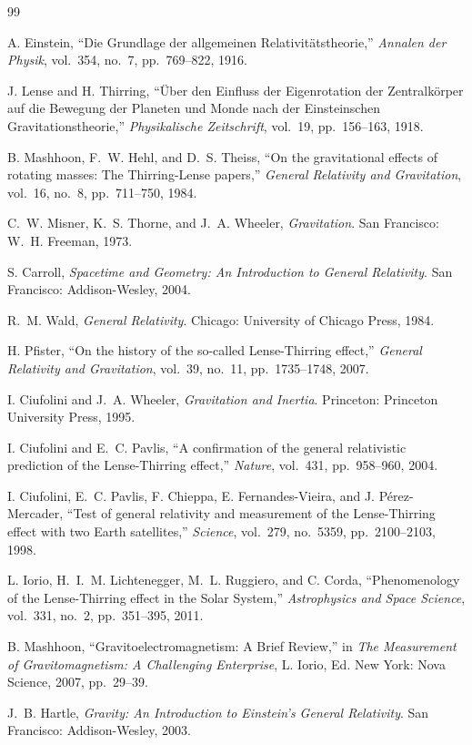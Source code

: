 \documentclass[12pt, a4paper]{article}
\theoremstyle{plain}
\theoremstyle{definition}
\theoremstyle{remark}
\begin{document}
\newpage








\newpage
\begin{thebibliography}{99}

A. Einstein, ``Die Grundlage der allgemeinen Relativit\"{a}tstheorie,''
\textit{Annalen der Physik}, vol.~354, no.~7, pp.~769--822, 1916.

J. Lense and H. Thirring, ``\"{U}ber den Einfluss der Eigenrotation der Zentralk\"{o}rper auf die Bewegung der Planeten und Monde nach der Einsteinschen Gravitationstheorie,''
\textit{Physikalische Zeitschrift}, vol.~19, pp.~156--163, 1918.

B. Mashhoon, F.~W. Hehl, and D.~S. Theiss, ``On the gravitational effects of rotating masses: The Thirring-Lense papers,''
\textit{General Relativity and Gravitation}, vol.~16, no.~8, pp.~711--750, 1984.

C.~W. Misner, K.~S. Thorne, and J.~A. Wheeler,
\textit{Gravitation}.
San Francisco: W.~H. Freeman, 1973.

S. Carroll,
\textit{Spacetime and Geometry: An Introduction to General Relativity}.
San Francisco: Addison-Wesley, 2004.

R.~M. Wald,
\textit{General Relativity}.
Chicago: University of Chicago Press, 1984.

H. Pfister, ``On the history of the so-called Lense-Thirring effect,''
\textit{General Relativity and Gravitation}, vol.~39, no.~11, pp.~1735--1748, 2007.

I. Ciufolini and J.~A. Wheeler,
\textit{Gravitation and Inertia}.
Princeton: Princeton University Press, 1995.

I. Ciufolini and E.~C. Pavlis, ``A confirmation of the general relativistic prediction of the Lense-Thirring effect,''
\textit{Nature}, vol.~431, pp.~958--960, 2004.

I. Ciufolini, E.~C. Pavlis, F. Chieppa, E. Fernandes-Vieira, and J. P\'{e}rez-Mercader,
``Test of general relativity and measurement of the Lense-Thirring effect with two Earth satellites,''
\textit{Science}, vol.~279, no.~5359, pp.~2100--2103, 1998.

L. Iorio, H.~I.~M. Lichtenegger, M.~L. Ruggiero, and C. Corda,
``Phenomenology of the Lense-Thirring effect in the Solar System,''
\textit{Astrophysics and Space Science}, vol.~331, no.~2, pp.~351--395, 2011.

B. Mashhoon, ``Gravitoelectromagnetism: A Brief Review,''
in \textit{The Measurement of Gravitomagnetism: A Challenging Enterprise},
L. Iorio, Ed. New York: Nova Science, 2007, pp.~29--39.

J.~B. Hartle,
\textit{Gravity: An Introduction to Einstein's General Relativity}.
San Francisco: Addison-Wesley, 2003.

\end{thebibliography}
\end{document}
